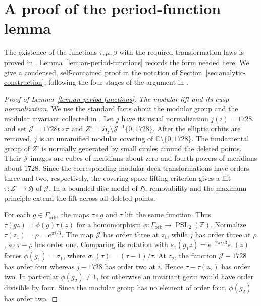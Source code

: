 \documentclass[11pt]{article}
\theoremstyle{definition}
\theoremstyle{remark}
\numberwithin{equation}{section}
\newcommand{\CC}{\mathbb C}
\newcommand{\ZZ}{\mathbb Z}
\begin{document}
\appendix
\section{A proof of the period-function lemma}
\label{app:period-torsor}

The existence of the functions $\tau,\mu,\beta$ with the required
transformation laws is proved in \citep[Theorem~3.4]{Alpoge2026}.
Lemma~\ref{lem:an-period-functions} records the form needed here.  We give a
condensed, self-contained proof in the notation of
Section~\ref{sec:analytic-construction}, following the four stages of the
argument in \citep[Sections~3.1--3.4]{Alpoge2026}.

\begin{proof}[Proof of Lemma~\ref{lem:an-period-functions}]
\smallskip
\noindent\emph{The modular lift and its cusp normalization.}
We use the standard facts about the modular group and the modular invariant
collected in
\citep[Chapter~VII, Sections~1.1--1.2 and~3.1--3.3]{Serre1973}.  Let $j$ have its usual
normalization $j(i)=1728$, and set $\mathcal J=1728t\circ\pi$ and
$Z^\circ=\mathfrak H_z\setminus\mathcal J^{-1}\{0,1728\}$.
After the elliptic orbits are removed, $j$ is an unramified modular
covering of $\CC\setminus\{0,1728\}$.  The fundamental group of
$Z^\circ$ is normally generated by small circles around the deleted
points.  Their $\mathcal J$-images are cubes of meridians about zero and fourth
powers of meridians about $1728$.  Since the corresponding modular deck
transformations have orders three and two, respectively, the
covering-space lifting criterion gives a lift
$\tau:Z^\circ\to\mathfrak H$ of $\mathcal J$.  In a bounded-disc model of
$\mathfrak H$, removability and the maximum principle extend the lift
across all deleted points.

For each $g\in\Gamma_{\mathrm{orb}}$, the maps $\tau\circ g$ and $\tau$ lift the
same function.  Thus $\tau(gz)=\phi(g)\tau(z)$ for a homomorphism
$\phi:\Gamma_{\mathrm{orb}}\to\operatorname{PSL}_2(\ZZ)$.  Normalize
$\tau(z_1)=\rho=e^{\pi i/3}$.  The map $\mathcal J$ has order three at
$z_1$, while $j$ has order three at $\rho$, so $\tau-\rho$ has
order one.  Comparing its rotation with
$s_1(g_1z)=e^{-2\pi i/3}s_1(z)$ forces
$\phi(g_1)=\sigma_1$, where
$\sigma_1(\tau)=(\tau-1)/\tau$.
At $z_2$, the function $\mathcal J-1728$ has order four whereas
$j-1728$ has order two at $i$.  Hence $\tau-\tau(z_2)$ has order
two.  In particular $\phi(g_2)\ne1$, for otherwise an invariant germ
would have order divisible by four.  Since the modular group has no
element of order four, $\phi(g_2)$ has order two.


\end{proof}
\end{document}
